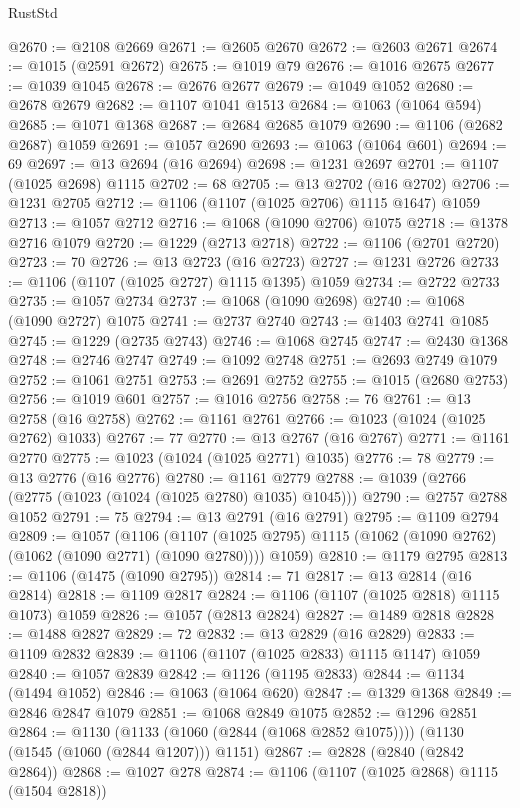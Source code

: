 \begin{lexlean}{RustStd}
\begin{coremodule}
@2670 := @2108 @2669
@2671 := @2605 @2670
@2672 := @2603 @2671
@2674 := @1015 (@2591 @2672)
@2675 := @1019 @79
@2676 := @1016 @2675
@2677 := @1039 @1045
@2678 := @2676 @2677
@2679 := @1049 @1052
@2680 := @2678 @2679
@2682 := @1107 @1041 @1513
@2684 := @1063 (@1064 @594)
@2685 := @1071 @1368
@2687 := @2684 @2685 @1079
@2690 := @1106 (@2682 @2687) @1059
@2691 := @1057 @2690
@2693 := @1063 (@1064 @601)
@2694 := 69
@2697 := @13 @2694 (@16 @2694)
@2698 := @1231 @2697
@2701 := @1107 (@1025 @2698) @1115
@2702 := 68
@2705 := @13 @2702 (@16 @2702)
@2706 := @1231 @2705
@2712 := @1106 (@1107 (@1025 @2706) @1115 @1647) @1059
@2713 := @1057 @2712
@2716 := @1068 (@1090 @2706) @1075
@2718 := @1378 @2716 @1079
@2720 := @1229 (@2713 @2718)
@2722 := @1106 (@2701 @2720)
@2723 := 70
@2726 := @13 @2723 (@16 @2723)
@2727 := @1231 @2726
@2733 := @1106 (@1107 (@1025 @2727) @1115 @1395) @1059
@2734 := @2722 @2733
@2735 := @1057 @2734
@2737 := @1068 (@1090 @2698)
@2740 := @1068 (@1090 @2727) @1075
@2741 := @2737 @2740
@2743 := @1403 @2741 @1085
@2745 := @1229 (@2735 @2743)
@2746 := @1068 @2745
@2747 := @2430 @1368
@2748 := @2746 @2747
@2749 := @1092 @2748
@2751 := @2693 @2749 @1079
@2752 := @1061 @2751
@2753 := @2691 @2752
@2755 := @1015 (@2680 @2753)
@2756 := @1019 @601
@2757 := @1016 @2756
@2758 := 76
@2761 := @13 @2758 (@16 @2758)
@2762 := @1161 @2761
@2766 := @1023 (@1024 (@1025 @2762) @1033)
@2767 := 77
@2770 := @13 @2767 (@16 @2767)
@2771 := @1161 @2770
@2775 := @1023 (@1024 (@1025 @2771) @1035)
@2776 := 78
@2779 := @13 @2776 (@16 @2776)
@2780 := @1161 @2779
@2788 := @1039 (@2766 (@2775 (@1023 (@1024 (@1025 @2780) @1035) @1045)))
@2790 := @2757 @2788 @1052
@2791 := 75
@2794 := @13 @2791 (@16 @2791)
@2795 := @1109 @2794
@2809 := @1057
    (@1106
      (@1107 (@1025 @2795) @1115 (@1062 (@1090 @2762) (@1062 (@1090 @2771) (@1090 @2780))))
      @1059)
@2810 := @1179 @2795
@2813 := @1106 (@1475 (@1090 @2795))
@2814 := 71
@2817 := @13 @2814 (@16 @2814)
@2818 := @1109 @2817
@2824 := @1106 (@1107 (@1025 @2818) @1115 @1073) @1059
@2826 := @1057 (@2813 @2824)
@2827 := @1489 @2818
@2828 := @1488 @2827
@2829 := 72
@2832 := @13 @2829 (@16 @2829)
@2833 := @1109 @2832
@2839 := @1106 (@1107 (@1025 @2833) @1115 @1147) @1059
@2840 := @1057 @2839
@2842 := @1126 (@1195 @2833)
@2844 := @1134 (@1494 @1052)
@2846 := @1063 (@1064 @620)
@2847 := @1329 @1368
@2849 := @2846 @2847 @1079
@2851 := @1068 @2849 @1075
@2852 := @1296 @2851
@2864 := @1130
    (@1133 (@1060 (@2844 (@1068 @2852 @1075))))
    (@1130 (@1545 (@1060 (@2844 @1207))) @1151)
@2867 := @2828 (@2840 (@2842 @2864))
@2868 := @1027 @278
@2874 := @1106 (@1107 (@1025 @2868) @1115 (@1504 @2818))

\end{coremodule}
\end{lexlean}

